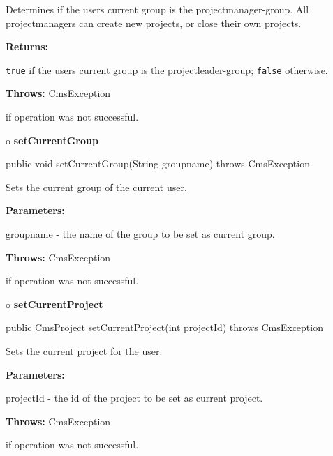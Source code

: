 \begin{description}
\htmlDD Determines if the users current group is the projectmanager-group.
\htmlBR
All projectmanagers can create new projects, or close their own projects. 

\begin{description}
\item {\bf Returns:}  

{\tt true} if the users current group is the projectleader-group; {\tt false}
otherwise.  
\item {\bf Throws:} CmsException  

if operation was not successful.  
\end{description}

\end{description}

o {\bf setCurrentGroup} 

\begin{PRE}
 public void setCurrentGroup(String groupname) throws CmsException
\end{PRE}

\begin{description}
\htmlDD Sets the current group of the current user. 

\begin{description}
\item {\bf Parameters:}  

groupname - the name of the group to be set as current group.  
\item {\bf Throws:} CmsException  

if operation was not successful.  
\end{description}

\end{description}

o {\bf setCurrentProject} 

\begin{PRE}
 public CmsProject setCurrentProject(int projectId) throws CmsException
\end{PRE}

\begin{description}
\htmlDD Sets the current project for the user. 

\begin{description}
\item {\bf Parameters:}  

projectId - the id of the project to be set as current project.  
\item {\bf Throws:} CmsException  

if operation was not successful.  
\end{description}

\end{description}

